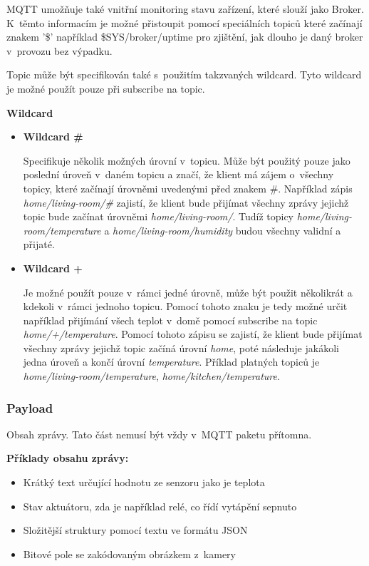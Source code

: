 MQTT umožňuje také vnitřní monitoring stavu zařízení, které slouží jako Broker. K~těmto informacím je možné přistoupit pomocí speciálních topiců které začínají znakem '\$' například \$SYS/broker/uptime pro zjištění, jak dlouho je daný broker v~provozu bez výpadku.

Topic může být specifikován také s~použitím takzvaných wildcard. Tyto wildcard je možné použít pouze při subscribe na topic. 

\newpage
\noindent\textbf{Wildcard\cite{mqtt-specification}}
\begin{itemize}
\item \textbf{Wildcard \#}

Specifikuje několik možných úrovní v~topicu. Může být použitý pouze jako poslední úroveň v~daném topicu a značí, že klient má zájem o~všechny topicy, které začínají úrovněmi uvedenými před znakem \#. Například zápis \emph{home/living-room/\#} zajistí, že klient bude přijímat všechny zprávy jejichž topic bude začínat úrovněmi \emph{home/living-room/}. Tudíž topicy \emph{home/living-room/temperature} a \emph{home/living-room/humidity} budou všechny validní a přijaté. 
\item \textbf{Wildcard +}

Je možné použít pouze v~rámci jedné úrovně, může být použit několikrát a kdekoli v~rámci jednoho topicu. Pomocí tohoto znaku je tedy možné určit například přijímání všech teplot v~domě pomocí subscribe na topic \emph{home/+/temperature}. Pomocí tohoto zápisu se zajistí, že klient bude přijímat všechny zprávy jejichž topic začíná úrovní \emph{home}, poté následuje jakákoli jedna úroveň a končí úrovní \emph{temperature}. Příklad platných topiců je \emph{home/living-room/temperature}, \emph{home/kitchen/temperature}.
\end{itemize}

\subsubsection*{Payload}
Obsah zprávy. Tato část nemusí být vždy v~MQTT paketu přítomna.

\noindent\textbf{Příklady obsahu zprávy:}
\begin{itemize}
  \item	Krátký text určující hodnotu ze senzoru jako je teplota
  \item	Stav aktuátoru, zda je například relé, co řídí vytápění sepnuto
  \item	Složitější struktury pomocí textu ve formátu JSON
  \item	Bitové pole se zakódovaným obrázkem z~kamery
  \end{itemize}

